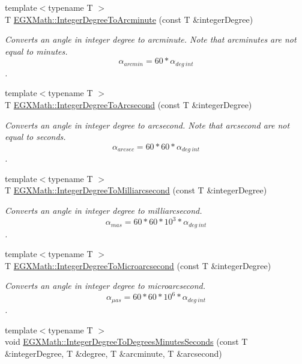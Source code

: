 \begin{DoxyCompactItemize}
{\footnotesize template$<$typename T $>$ }\\T \mbox{\hyperlink{group___e_g_x_math-_angle_conversions-_integer_degree_ga78b014e7649d666a3647c467e64e4fe8}{E\+G\+X\+Math\+::\+Integer\+Degree\+To\+Arcminute}} (const T \&integer\+Degree)
\begin{DoxyCompactList}\small\item\em Converts an angle in integer degree to arcminute. Note that arcminutes are not equal to minutes. \[\alpha_{arcmin}= 60 * \alpha_{deg\ int}\]. \end{DoxyCompactList}\item 
{\footnotesize template$<$typename T $>$ }\\T \mbox{\hyperlink{group___e_g_x_math-_angle_conversions-_integer_degree_gaa04058a2fea3dc3678264a05fac6e1ae}{E\+G\+X\+Math\+::\+Integer\+Degree\+To\+Arcsecond}} (const T \&integer\+Degree)
\begin{DoxyCompactList}\small\item\em Converts an angle in integer degree to arcsecond. Note that arcsecond are not equal to seconds. \[\alpha_{arcsec}=60 * 60 * \alpha_{deg\ int}\]. \end{DoxyCompactList}\item 
{\footnotesize template$<$typename T $>$ }\\T \mbox{\hyperlink{group___e_g_x_math-_angle_conversions-_integer_degree_gadc43f22e832cd8fcf16b7bd2269ae348}{E\+G\+X\+Math\+::\+Integer\+Degree\+To\+Milliarcsecond}} (const T \&integer\+Degree)
\begin{DoxyCompactList}\small\item\em Converts an angle in integer degree to milliarcsecond. \[\alpha_{mas}=60 * 60 * 10^3 * \alpha_{deg\ int} \]. \end{DoxyCompactList}\item 
{\footnotesize template$<$typename T $>$ }\\T \mbox{\hyperlink{group___e_g_x_math-_angle_conversions-_integer_degree_ga69179d6082764595c7014805e1f6b31e}{E\+G\+X\+Math\+::\+Integer\+Degree\+To\+Microarcsecond}} (const T \&integer\+Degree)
\begin{DoxyCompactList}\small\item\em Converts an angle in integer degree to microarcsecond. \[\alpha_{\mu as}=60 * 60 * 10^6 * \alpha_{deg\ int}\]. \end{DoxyCompactList}\item 
{\footnotesize template$<$typename T $>$ }\\void \mbox{\hyperlink{group___e_g_x_math-_angle_conversions-_integer_degree_ga204317877546ea6bbafe5ff558f55a16}{E\+G\+X\+Math\+::\+Integer\+Degree\+To\+Degrees\+Minutes\+Seconds}} (const T \&integer\+Degree, T \&degree, T \&arcminute, T \&arcsecond)

\end{DoxyCompactItemize}
